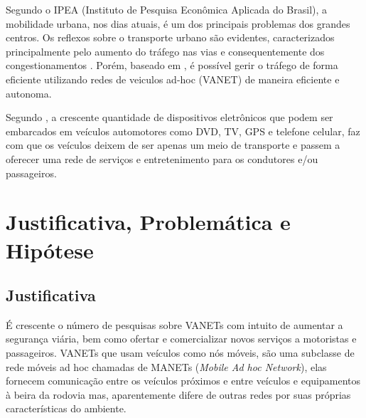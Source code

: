 \documentclass[
	12pt,				%
	oneside,			%
	a4paper,			%
	english,			%
	brazil				%
	]{abntex2ppgsi}
\begin{document}
Segundo o IPEA (Instituto de Pesquisa Econômica Aplicada do Brasil), a mobilidade urbana, nos dias atuais, é um dos principais problemas dos grandes centros. Os reflexos sobre o transporte urbano são evidentes, caracterizados principalmente pelo aumento do tráfego nas vias e consequentemente dos congestionamentos \cite{carvalho2010mobilidade}. Porém, baseado em  , é possível gerir o tráfego de forma eficiente utilizando redes de veiculos ad-hoc (VANET) de maneira eficiente e autonoma.

Segundo  , a crescente quantidade de dispositivos eletrônicos que podem ser embarcados em veículos automotores como DVD, TV, GPS e telefone celular, faz com que os veículos deixem de ser apenas um meio de transporte e passem a oferecer uma rede de serviços e entretenimento para os condutores e/ou passageiros.

%


\section{Justificativa, Problemática e Hipótese}

\subsection{Justificativa}

É crescente o número de pesquisas sobre VANETs  com intuito de aumentar a segurança viária, bem como ofertar e comercializar novos serviços a motoristas e passageiros. VANETs que usam veículos como nós móveis, são uma subclasse de rede móveis ad hoc chamadas de MANETs (\textit{Mobile Ad hoc Network}), elas fornecem comunicação entre os veículos próximos e entre veículos  e equipamentos à beira da rodovia mas, aparentemente difere de outras redes por suas próprias características do ambiente. 
\end{document}
